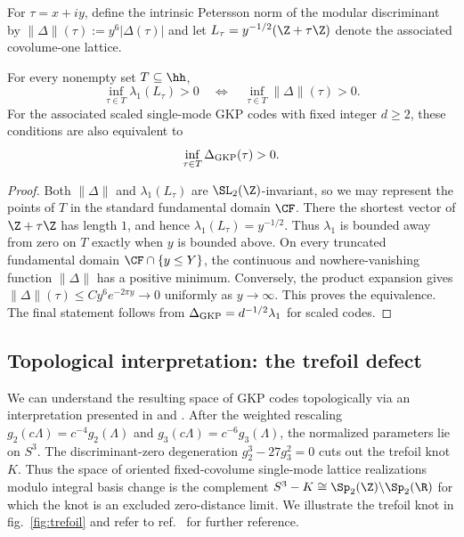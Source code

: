 \documentclass[a4paper, aps, pra, 11pt, onecolumn, tightenlines, superscriptaddress]{revtex4-2}
\begin{document}
For $\tau=x+iy$, define the intrinsic Petersson norm of the modular discriminant by $\|\Delta\|(\tau):=y^6|\Delta(\tau)|$ and let $L_\tau=y^{-1/2}(\Z+\tau\Z)$ denote the associated covolume-one lattice.
\begin{prop}\label{prop:distance}
For every nonempty set $T\subseteq\hh$,
\begin{equation}
\inf_{\tau\in T}\lambda_1(L_\tau)>0
\quad\Longleftrightarrow\quad
\inf_{\tau\in T}\|\Delta\|(\tau)>0.
\end{equation}
For the associated scaled single-mode GKP codes with fixed integer $d\geq2$, these conditions are also equivalent to
\begin{equation}
\inf_{\tau\in T}\Delta_{\rm GKP}(\tau)>0.
\end{equation}
\end{prop}
\begin{proof}
Both $\|\Delta\|$ and $\lambda_1(L_\tau)$ are $\SL_2(\Z)$-invariant, so we may represent the points of $T$ in the standard fundamental domain $\CF$. There the shortest vector of $\Z+\tau\Z$ has length $1$, and hence $\lambda_1(L_\tau)=y^{-1/2}$. Thus $\lambda_1$ is bounded away from zero on $T$ exactly when $y$ is bounded above. On every truncated fundamental domain $\CF\cap\{y\leq Y\}$, the continuous and nowhere-vanishing function $\|\Delta\|$ has a positive minimum. Conversely, the product expansion gives $\|\Delta\|(\tau)\leq C y^6e^{-2\pi y}\to0$ uniformly as $y\to\infty$. This proves the equivalence. The final statement follows from $\Delta_{\rm GKP}=d^{-1/2}\lambda_1$ for scaled codes.
\end{proof}


\subsection{Topological interpretation: the trefoil defect}
We can understand the resulting space of GKP codes topologically via an interpretation presented in \cite{Ghys} and \cite{Milnor+1972}. 
After the weighted rescaling $g_2(c\Lambda)=c^{-4}g_2(\Lambda)$ and $g_3(c\Lambda)=c^{-6}g_3(\Lambda)$, the normalized parameters lie on $S^3$. The discriminant-zero degeneration $g_2^3-27g_3^2=0$ cuts out the trefoil knot $K$. Thus the space of oriented fixed-covolume single-mode lattice realizations modulo integral basis change is the complement $S^3-K\cong\Sp_2(\Z)\backslash\Sp_2(\R)$ for which the knot is an excluded zero-distance limit.
We illustrate the trefoil knot in fig.~\ref{fig:trefoil} and refer to ref.~\cite{AMSGhys, Ghys} for further reference. 
\end{document}
